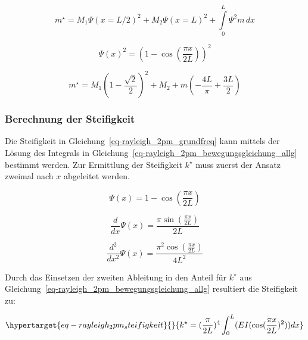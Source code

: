 \documentclass[
  letterpaper,
  DIV=11]{scrreprt}
\begin{document}
\begin{equation}m^{\star} = M_{1} \Psi(x=L/2)^{2} + M_{2} \Psi(x=L)^{2} + \int\limits_{0}^{L} \Psi^{2} m\, dx\end{equation}

\begin{equation}\Psi(x)^{2} = \left(1 - \cos{\left(\frac{\pi x}{2 L} \right)}\right)^{2}\end{equation}

\begin{equation}m^{\star} = M_{1} \left(1 - \frac{\sqrt{2}}{2}\right)^{2} + M_{2} + m \left(- \frac{4 L}{\pi} + \frac{3 L}{2}\right)\end{equation}

\hypertarget{berechnung-der-steifigkeit}{%
\subsubsection{Berechnung der
Steifigkeit}\label{berechnung-der-steifigkeit}}

Die Steifigkeit in Gleichung~\ref{eq-rayleigh_2pm_grundfreq} kann
mittels der Lösung des Integrals in
Gleichung~\ref{eq-rayleigh_2pm_bewegungsgleichung_allg} bestimmt werden.
Zur Ermittlung der Steifigkeit \(k^\star\) muss zuerst der Ansatz
zweimal nach \(x\) abgeleitet werden.

\begin{equation}\Psi{\left(x \right)} = 1 - \cos{\left(\frac{\pi x}{2 L} \right)}\end{equation}

\begin{equation}\frac{d}{d x} \Psi{\left(x \right)} = \frac{\pi \sin{\left(\frac{\pi x}{2 L} \right)}}{2 L}\end{equation}

\begin{equation}\frac{d^{2}}{d x^{2}} \Psi{\left(x \right)} = \frac{\pi^{2} \cos{\left(\frac{\pi x}{2 L} \right)}}{4 L^{2}}\end{equation}

Durch das Einsetzen der zweiten Ableitung in den Anteil für \(k^\star\)
aus Gleichung~\ref{eq-rayleigh_2pm_bewegungsgleichung_allg} resultiert
die Steifigkeit zu:

\begin{equation}\protect\hypertarget{eq-rayleigh_2pm_steifigkeit}{}{
k^\star = (\frac{\pi}{2L})^4 \int_0^L(EI(\cos(\frac{\pi x}{2L})^2)) dx
}\label{eq-rayleigh_2pm_steifigkeit}\end{equation}
\end{document}
